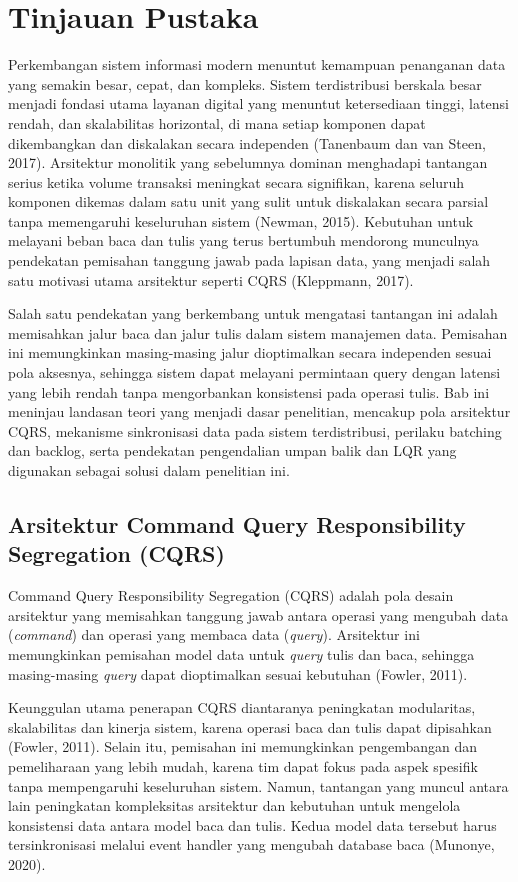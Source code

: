 \chapter{Tinjauan Pustaka}

Perkembangan sistem informasi modern menuntut kemampuan penanganan data yang semakin besar, cepat, dan kompleks.
Sistem terdistribusi berskala besar menjadi fondasi utama layanan digital yang menuntut ketersediaan tinggi, latensi rendah, dan skalabilitas horizontal, di mana setiap komponen dapat dikembangkan dan diskalakan secara independen (Tanenbaum dan van Steen, 2017).
Arsitektur monolitik yang sebelumnya dominan menghadapi tantangan serius ketika volume transaksi meningkat secara signifikan, karena seluruh komponen dikemas dalam satu unit yang sulit untuk diskalakan secara parsial tanpa memengaruhi keseluruhan sistem (Newman, 2015).
Kebutuhan untuk melayani beban baca dan tulis yang terus bertumbuh mendorong munculnya pendekatan pemisahan tanggung jawab pada lapisan data, yang menjadi salah satu motivasi utama arsitektur seperti CQRS (Kleppmann, 2017).

Salah satu pendekatan yang berkembang untuk mengatasi tantangan ini adalah memisahkan jalur baca dan jalur tulis dalam sistem manajemen data.
Pemisahan ini memungkinkan masing-masing jalur dioptimalkan secara independen sesuai pola aksesnya, sehingga sistem dapat melayani permintaan query dengan latensi yang lebih rendah tanpa mengorbankan konsistensi pada operasi tulis.
Bab ini meninjau landasan teori yang menjadi dasar penelitian, mencakup pola arsitektur CQRS, mekanisme sinkronisasi data pada sistem terdistribusi, perilaku batching dan backlog, serta pendekatan pengendalian umpan balik dan LQR yang digunakan sebagai solusi dalam penelitian ini.

\section{Arsitektur Command Query Responsibility Segregation (CQRS)}

Command Query Responsibility Segregation (CQRS) adalah pola desain arsitektur yang memisahkan tanggung jawab antara operasi yang mengubah data (\emph{command}) dan operasi yang membaca data (\emph{query}).
Arsitektur ini memungkinkan pemisahan model data untuk \emph{query} tulis dan baca, sehingga masing-masing \emph{query} dapat dioptimalkan sesuai kebutuhan (Fowler, 2011).

Keunggulan utama penerapan CQRS diantaranya peningkatan modularitas, skalabilitas dan kinerja sistem, karena operasi baca dan tulis dapat dipisahkan (Fowler, 2011).
Selain itu, pemisahan ini memungkinkan pengembangan dan pemeliharaan yang lebih mudah, karena tim dapat fokus pada aspek spesifik tanpa mempengaruhi keseluruhan sistem.
Namun, tantangan yang muncul antara lain peningkatan kompleksitas arsitektur dan kebutuhan untuk mengelola konsistensi data antara model baca dan tulis.
Kedua model data tersebut harus tersinkronisasi melalui event handler yang mengubah database baca (Munonye, 2020).

